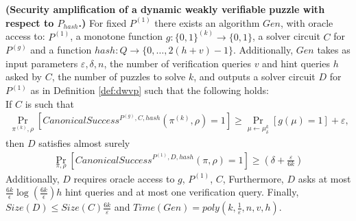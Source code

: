 \begin{lemma}\textbf{(Security amplification of a dynamic weakly verifiable puzzle with respect to $P_{hash}$.)}
  \label{lemma:sec_amp_for_p_hash}
  For fixed $P^{(1)}$ there exists an algorithm $Gen$, with oracle access to:
  $P^{(1)}$, a monotone function $g:\{0,1\}^{(k)} \rightarrow \{0,1\}$,
  a solver circuit $C$ for $P^{(g)}$ and a function $hash : Q \rightarrow \{0, \dots, 2(h+v)-1\}$.
  Additionally, $Gen$ takes as input parameters $\varepsilon, \delta, n$,
  the number of verification queries $v$ and hint queries $h$ asked by $C$, the number of puzzles to solve $k$,
  and outputs a solver circuit $D$ for $P^{(1)}$ as in Definition \ref{def:dwvp}
  such that the following holds: \\
  If $C$ is such that \\
  \begin{align*}
    \underset{\pi^{(k)}, \rho}{\Pr}\left[CanonicalSuccess^{P^{(g)}, C, hash}(\pi^{(k)}, \rho)=1\right] \geq \underset{\mu \leftarrow \mu_\delta^k}{\Pr}[g(\mu) = 1] + \varepsilon,
  \end{align*}
  then $D$ satisfies almost surely
  \begin{align*}
    \underset{\pi, \rho}{\Pr}\left[CanonicalSuccess^{P^{(1)}, D, hash}(\pi, \rho)=1\right] \geq (\delta + \frac{\varepsilon}{6k})
  \end{align*}
  Additionally, $D$ requires oracle access to $g$, $P^{(1)}$, $C$,
  Furthermore, $D$ asks at most $\frac{6k}{\epsilon}\log\left(\frac{6k}{\epsilon}\right) h$ hint queries and at most one verification query.
  Finally, $Size(D) \leq Size(C)\frac{6k}{\varepsilon}$ and $Time(Gen) = poly(k, \frac{1}{\varepsilon}, n, v, h)$.
\end{lemma}
%
